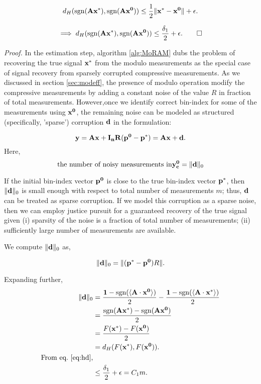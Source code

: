 $$
d_H(\mathrm{sgn}({\mathbf{Ax^*}}), \mathrm{sgn}({\mathbf{Ax^0}})) \leq \frac{1}{2}\|\mathbf{x^*-x^0}\| + \epsilon.
$$

\begin{align}
\label{eq:hd}
\implies d_H(\mathrm{sgn}({\mathbf{Ax^*}}), \mathrm{sgn}({\mathbf{Ax^0}})) \leq \frac{\delta_1}{2} + \epsilon.
\qed
\end{align}




\textit{Proof.} In the estimation step, algorithm \ref{alg:MoRAM} dubs the problem of recovering the true signal $\mathbf{x^*}$ from the modulo measurements as the special case of signal recovery from sparsely corrupted compressive measurements. As we discussed in section \ref{sec:modeff}, the presence of modulo operation modify the compressive measurements by adding a constant noise of the value $R$ in fraction of total measurements. However,once we identify correct bin-index for some of the measurements using $\mathbf{x^0}$, the remaining noise can be modeled as structured (specifically, 'sparse') corruption $\mathbf{d}$ in the formulation:

$$
\mathbf{y} = \mathbf{Ax} + \mathbf{I_nR(p^0-p^*)} = \mathbf{Ax} + \mathbf{d}.
$$  
Here,
$$
\textnormal{the number of noisy measurements in} \mathbf{y^0_c} = \|\mathbf{d}\|_0
$$

If the initial bin-index vector $\mathbf{p^0}$ is close to the true bin-index vector $\mathbf{p^*}$, then $\|\mathbf{d}\|_0$ is small enough with respect to total number of measurements $m$; thus, $\mathbf{\mathbf{d}}$ can be treated as sparse corruption. If we model this corruption as a sparse noise, then we can employ justice pursuit for a guaranteed recovery of the true signal given (i) sparsity of the noise is a fraction of total number of measurements; (ii) sufficiently large number of measurements are available.  

We compute $\|\mathbf{d}\|_0$ as,

$$
\|\mathbf{d}\|_0 =  \|(\mathbf{p^*-p^0})R\|.
$$

Expanding further,
\begin{align*}
\|\mathbf{d}\|_0  & = \frac{\mathbf{1}-\mathrm{sgn}(\langle \mathbf{A} \cdot \mathbf{x^0} \rangle)}{2} -  \frac{\mathbf{1}-\mathrm{sgn}(\langle \mathbf{A} \cdot \mathbf{x^*} \rangle)}{2} \\
& = \frac{\mathrm{sgn}({\mathbf{Ax^*}})- \mathrm{sgn}({\mathbf{Ax^0}})}{2} \\
& = \frac{F\mathbf{(x^*)} - F\mathbf{(x^0)}}{2} \\
& = d_H(F\mathbf{(x^*)}, F\mathbf{(x^0)}). \\
\textnormal{From eq.~\ref{eq:hd},} \\
& \leq \frac{\delta_1}{2} + \epsilon = C_1m.
\end{align*}

